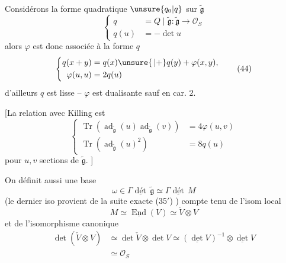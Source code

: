 Considérons la forme quadratique $\unsure{q_0|q}$ sur $\widetilde{\mathfrak g}$
\[
\left\{\begin{aligned}
q&=Q\mid\widetilde{\mathfrak g}:\widetilde{\mathfrak g}\longrightarrow\mathcal O_S\\
q(u)&=-\det u
\end{aligned}\right.\tag*{(43)}
\]
alors  $\varphi$ est donc associée à la forme $q$
\[
\left\{\begin{aligned}
q(x+y)&=q(x)\unsure{{}\,|+}q(y)+\varphi(x,y),\\
\varphi(u,u)&=2q(u)
\end{aligned}\right.\tag*{(44)}
\]
d'ailleurs $q$ est lisse -- $\varphi$ est dualisante sauf en car. $2$.

[La relation avec Killing est
\[
\left\{\begin{aligned}
\operatorname{Tr}(\operatorname{ad}_{\widetilde{\mathfrak g}}(u)\operatorname{ad}_{\widetilde{\mathfrak g}}(v))&=4\varphi(u,v)\\
\operatorname{Tr}(\operatorname{ad}_{\widetilde{\mathfrak g}}(u)^2)&=8q(u)
\end{aligned}\right.\tag*{(45)}
\]
pour $u,v$ sections de $\widetilde{\mathfrak g}$. \enspace]

On définit aussi une base
\[
\omega\in\Gamma\underline{\operatorname{\text{dét}}}\,\widetilde{\mathfrak g}\simeq\Gamma\underline{\operatorname{\text{dét}}}\,M\tag*{(46)}
\]
(le dernier iso provient de la suite exacte (35$'$) ) compte tenu de l'isom local
\[
M\simeq\underline{\operatorname{End}}(V)\simeq\check V\otimes V
\]
et de l'isomorphisme canonique
\[
\begin{aligned}
\det(\check V\otimes V)&\simeq\det\check V\otimes\det V\simeq(\underline{\det}V)^{-1}\otimes\underline{\det}V\\
&\simeq\mathcal O_S
\end{aligned}\tag*{(47)}
\]
